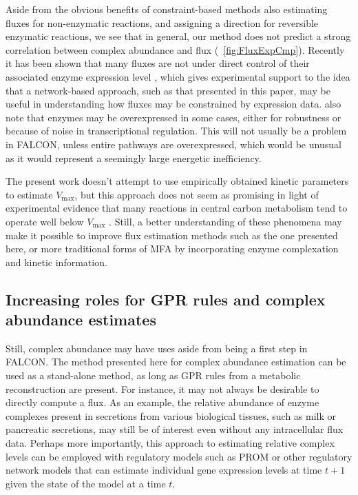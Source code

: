 Aside from the obvious benefits
of constraint-based methods also estimating fluxes for non-enzymatic
reactions, and assigning a direction for reversible enzymatic
reactions, we see that in general, our method does not predict a
strong correlation between complex abundance and flux
(\suppOrApp \Fig~\ref{fig:FluxExpCmp}). 
Recently it has been shown that many fluxes are not
under direct control of their associated enzyme expression
level \citep{Chubukov2013}, which gives experimental support to the
idea that a network-based approach, such as that
presented in this paper, may be useful in understanding how fluxes may
be constrained by expression data. \citealt{Chubukov2013} also note that enzymes
may be overexpressed in some cases, either for robustness or because
of noise in transcriptional regulation. This will not usually be a
problem in FALCON, unless entire pathways are overexpressed, which
would be unusual as it would represent a seemingly large energetic
inefficiency.

The present work doesn't attempt to use empirically
obtained kinetic parameters to estimate $V_{\max}$, but this approach
does not seem as promising in light of experimental evidence that many
reactions in central carbon metabolism tend to operate well below
$V_{\max}$ \citep{Bennett2009}. Still, a better understanding of these
phenomena may make it possible to improve flux estimation methods such
as the one presented here, or more traditional forms of MFA
\citep{Shestov2013a} by incorporating enzyme complexation and kinetic
information.


\subsection{Increasing roles for GPR rules and complex abundance estimates}
Still, complex abundance may have uses aside from being a first
step in FALCON. The method presented here for complex abundance
estimation can be used as a stand-alone method, as long as GPR
rules from a metabolic reconstruction are present. For instance, it
may not always be desirable to directly compute a flux. As an example,
the relative abundance of enzyme complexes present in secretions
from various biological tissues, such as milk or pancreatic
secretions, may still be of interest even without any intracellular
flux data. Perhaps more importantly, this approach to estimating
relative complex levels can be employed with regulatory models such as
PROM \citep{Chandrasekaran2010a} or other regulatory network models
that can estimate individual gene expression levels at time $t+1$
given the state of the model at a time $t$.

